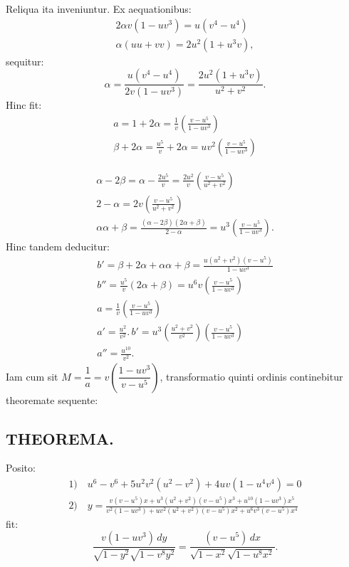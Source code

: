 \documentclass{article}
\begin{document}
Reliqua ita inveniuntur. Ex aequationibus:
\[
\begin{gathered}
2\alpha v(1-uv^{3})=u(v^{4}-u^{4})\\
\alpha(uu+vv)=2u^{2}(1+u^{3}v),
\end{gathered}
\]
sequitur:
\[
\alpha=\frac{u(v^{4}-u^{4})}{2v(1-uv^{3})}=\frac{2u^{2}(1+u^{3}v)}{u^{2}+v^{2}}.
\]
Hinc fit:
\[
\begin{gathered}
a=1+2\alpha=\frac{1}{v}\left(\frac{v-u^{5}}{1-uv^{3}}\right)\\
\beta+2\alpha=\frac{u^{5}}{v}+2\alpha=uv^{2}\left(\frac{v-u^{5}}{1-uv^{3}}\right)
\end{gathered}
\]

\[
\begin{gathered}
\alpha-2\beta=\alpha-\frac{2u^{5}}{v}=\frac{2u^{2}}{v}\left(\frac{v-u^{5}}{u^{2}+v^{2}}\right)\\
2-\alpha=2v\left(\frac{v-u^{5}}{u^{2}+v^{2}}\right)\\
\alpha\alpha+\beta=\frac{(\alpha-2\beta)(2\alpha+\beta)}{2-\alpha}=u^{3}\left(\frac{v-u^{5}}{1-uv^{3}}\right).
\end{gathered}
\]
Hinc tandem deducitur:
\[
\begin{gathered}
b'=\beta+2\alpha+\alpha\alpha+\beta=\frac{u(u^{2}+v^{2})(v-u^{5})}{1-uv^{3}}\\
b''=\frac{u^{5}}{v}(2\alpha+\beta)=u^{6}v\left(\frac{v-u^{5}}{1-uv^{3}}\right)\\
a=\frac{1}{v}\left(\frac{v-u^{5}}{1-uv^{3}}\right)\\
a'=\frac{u^{2}}{v^{2}}.\,b'=u^{3}\left(\frac{u^{2}+v^{2}}{v^{2}}\right)\left(\frac{v-u^{5}}{1-uv^{3}}\right)\\
a''=\frac{u^{10}}{v^{2}}.
\end{gathered}
\]
Iam cum sit $M=\dfrac{1}{a}=v\left(\dfrac{1-uv^{3}}{v-u^{5}}\right)$, transformatio quinti ordinis continebitur theoremate sequente:

\subsection*{THEOREMA.}

Posito:
\[
\begin{gathered}
\text{1)}\quad u^{6}-v^{6}+5u^{2}v^{2}(u^{2}-v^{2})+4uv(1-u^{4}v^{4})=0\\
\text{2)}\quad y=\frac{v(v-u^{5})x+u^{3}(u^{2}+v^{2})(v-u^{5})x^{3}+u^{10}(1-uv^{3})x^{5}}{v^{2}(1-uv^{3})+uv^{2}(u^{2}+v^{2})(v-u^{5})x^{2}+u^{6}v^{3}(v-u^{5})x^{4}}
\end{gathered}
\]
fit:
\[
\frac{v(1-uv^{3})\,dy}{\sqrt{1-y^{2}}\sqrt{1-v^{8}y^{2}}}=\frac{(v-u^{5})\,dx}{\sqrt{1-x^{2}}\sqrt{1-u^{8}x^{2}}}.
\]
\end{document}
